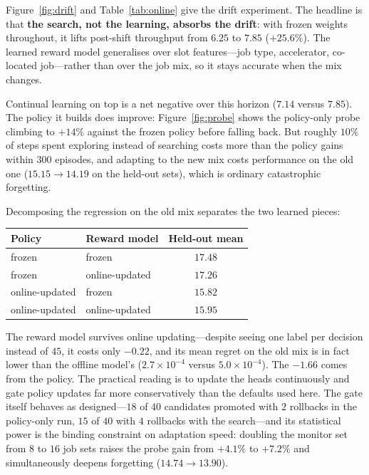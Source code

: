 \documentclass{article}
\begin{document}
Figure~\ref{fig:drift} and Table~\ref{tab:online} give the drift experiment. The
headline is that \textbf{the search, not the learning, absorbs the drift}: with
frozen weights throughout, it lifts post-shift throughput from $6.25$ to $7.85$
($+25.6\%$). The learned reward model generalises over slot features---job type,
accelerator, co-located job---rather than over the job mix, so it stays accurate
when the mix changes.

Continual learning on top is a net negative over this horizon ($7.14$ versus
$7.85$). The policy it builds does improve: Figure~\ref{fig:probe} shows the
policy-only probe climbing to $+14\%$ against the frozen policy before falling
back. But roughly $10\%$ of steps spent exploring instead of searching costs more
than the policy gains within $300$ episodes, and adapting to the new mix costs
performance on the old one ($15.15 \rightarrow 14.19$ on the held-out sets), which
is ordinary catastrophic forgetting.

Decomposing the regression on the old mix separates the two learned pieces:

\begin{center}
\small
\begin{tabular}{llc}
\toprule
Policy & Reward model & Held-out mean \\
\midrule
frozen  & frozen  & $\mathbf{17.48}$ \\
frozen  & online-updated & $17.26$ \\
online-updated & frozen & $15.82$ \\
online-updated & online-updated & $15.95$ \\
\bottomrule
\end{tabular}
\end{center}

\noindent The reward model survives online updating---despite seeing one label per
decision instead of $45$, it costs only $-0.22$, and its mean regret on the old mix
is in fact lower than the offline model's ($2.7 \times 10^{-4}$ versus
$5.0 \times 10^{-4}$). The $-1.66$ comes from the policy. The practical reading is
to update the heads continuously and gate policy updates far more conservatively
than the defaults used here. The gate itself behaves as designed---$18$ of $40$
candidates promoted with $2$ rollbacks in the policy-only run, $15$ of $40$ with
$4$ rollbacks with the search---and its statistical power is the binding constraint
on adaptation speed: doubling the monitor set from $8$ to $16$ job sets raises the
probe gain from $+4.1\%$ to $+7.2\%$ and simultaneously deepens forgetting
($14.74 \rightarrow 13.90$).
\end{document}
